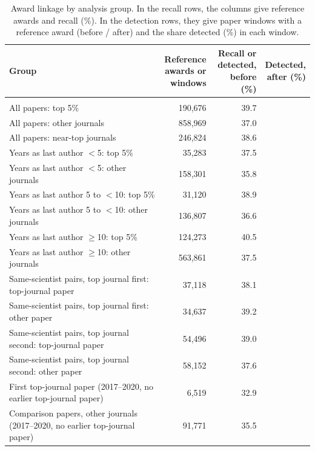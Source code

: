 \begin{table}[H]
\centering\small
\caption{Award linkage by analysis group. In the recall rows, the columns give reference awards and recall (\%). In the detection rows, they give paper windows with a reference award (before / after) and the share detected (\%) in each window.}\label{tab:s_linkage_groups}
\footnotesize
\begin{tabularx}{\linewidth}{>{\raggedright\arraybackslash}Xrrr}
\toprule
Group & \makecell[rb]{Reference\\awards or\\windows} & \makecell[rb]{Recall or\\detected,\\before (\%)} & \makecell[rb]{Detected,\\after (\%)} \\
\midrule
\multicolumn{4}{>{\raggedright\arraybackslash}p{\dimexpr\textwidth-2\tabcolsep\relax}}{\textit{Award-level recall: share of acknowledged awards led by the author, months $-24$ to $<36$}} \\
All papers: top 5\% & 190,676 & 39.7 &  \\
All papers: other journals & 858,969 & 37.0 &  \\
All papers: near-top journals & 246,824 & 38.6 &  \\
Years as last author $<$5: top 5\% & 35,283 & 37.5 &  \\
Years as last author $<$5: other journals & 158,301 & 35.8 &  \\
Years as last author 5 to $<$10: top 5\% & 31,120 & 38.9 &  \\
Years as last author 5 to $<$10: other journals & 136,807 & 36.6 &  \\
Years as last author $\geq$10: top 5\% & 124,273 & 40.5 &  \\
Years as last author $\geq$10: other journals & 563,861 & 37.5 &  \\
Same-scientist pairs, top journal first: top-journal paper & 37,118 & 38.1 &  \\
Same-scientist pairs, top journal first: other paper & 34,637 & 39.2 &  \\
Same-scientist pairs, top journal second: top-journal paper & 54,496 & 39.0 &  \\
Same-scientist pairs, top journal second: other paper & 58,152 & 37.6 &  \\
First top-journal paper (2017--2020, no earlier top-journal paper) & 6,519 & 32.9 &  \\
Comparison papers, other journals (2017--2020, no earlier top-journal paper) & 91,771 & 35.5 &  \\

\end{tabularx}
\end{table}
